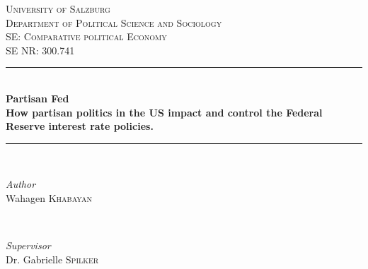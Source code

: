 \documentclass[11pt]{article}
\begin{document}
\renewcommand{\baselinestretch}{1.5}

\begin{titlepage} 
	\newcommand{\HRule}{\rule{\linewidth}{0.5mm}} %
	
	\center %
	
	
	\textsc{\LARGE University of Salzburg}\\[1.5cm]
	 \textsc{\large Department of Political Science and Sociology}\\[0.5cm] %
	
	\textsc{\Large SE: Comparative political Economy}\\[0.5cm] %
	
	\textsc{\large SE NR: 300.741}\\[0.5cm] %
	
	
	\HRule\\[0.7cm]
	
	{\huge\bfseries Partisan Fed }\\[0.4cm] 
	\bfseries {How partisan politics in the US impact and control the Federal Reserve interest rate policies.}\
	
	\HRule\\[1.5cm]
	
	
	\begin{minipage}{0.4\textwidth}
		\begin{flushleft}
			\large
			\textit{Author}\\
			Wahagen \textsc{Khabayan} %
		\end{flushleft}
	\end{minipage}
	~
	\begin{minipage}{0.4\textwidth}
		\begin{flushright}
			\large
			\textit{Supervisor}\\
			Dr. Gabrielle   \textsc{Spilker} %
		\end{flushright}
	\end{minipage}
	

\end{titlepage}
\end{document}
